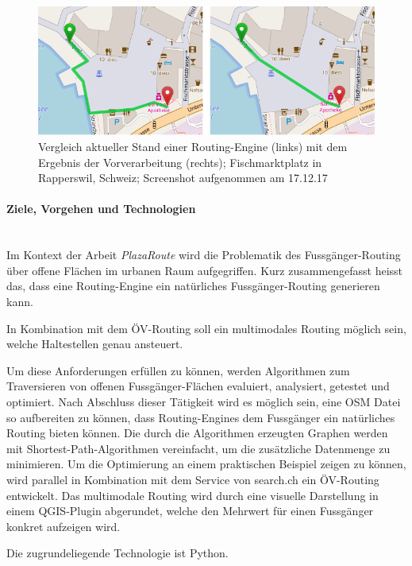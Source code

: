 \begin{figure}[ht]
    \centering
    \includegraphics[width=1\linewidth]{technicalreport/img/compare_fischmarktplatz.png}
    \caption[Vergleich Ausgangslage und Ergebnis]{Vergleich aktueller Stand einer Routing-Engine (links) mit dem Ergebnis der Vorverarbeitung (rechts); Fischmarktplatz in Rapperswil, Schweiz; Screenshot aufgenommen am 17.12.17}
    \label{fig:compare_fischmarktplatz}
\end{figure}


\paragraph{Ziele, Vorgehen und Technologien}~\\
Im Kontext der Arbeit \emph{PlazaRoute} wird die Problematik des Fussgänger-Routing über offene Flächen im urbanen Raum aufgegriffen. Kurz zusammengefasst heisst das, dass eine Routing-Engine ein natürliches Fussgänger-Routing generieren kann.

In Kombination mit dem ÖV-Routing soll ein multimodales Routing möglich sein, welche Haltestellen genau ansteuert.

Um diese Anforderungen erfüllen zu können, werden Algorithmen zum Traversieren von offenen Fussgänger-Flächen evaluiert, analysiert, getestet und optimiert. Nach Abschluss dieser Tätigkeit wird es möglich sein, eine \ac{OSM} Datei so aufbereiten zu können, dass Routing-Engines dem Fussgänger ein natürliches Routing bieten können. Die durch die Algorithmen erzeugten Graphen werden mit Shortest-Path-Algorithmen vereinfacht, um die zusätzliche Datenmenge zu minimieren.
Um die Optimierung an einem praktischen Beispiel zeigen zu können, wird parallel in Kombination mit dem Service von search.ch ein ÖV-Routing entwickelt. Das multimodale Routing wird durch eine visuelle Darstellung in einem QGIS-Plugin abgerundet, welche den Mehrwert für einen Fussgänger konkret aufzeigen wird.

Die zugrundeliegende Technologie ist Python.

